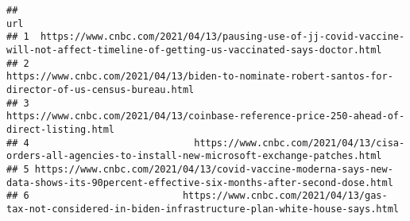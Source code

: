 \documentclass[
]{article}
\begin{document}
\begin{verbatim}
##                                                                                                                                   url
## 1  https://www.cnbc.com/2021/04/13/pausing-use-of-jj-covid-vaccine-will-not-affect-timeline-of-getting-us-vaccinated-says-doctor.html
## 2                               https://www.cnbc.com/2021/04/13/biden-to-nominate-robert-santos-for-director-of-us-census-bureau.html
## 3                                           https://www.cnbc.com/2021/04/13/coinbase-reference-price-250-ahead-of-direct-listing.html
## 4                             https://www.cnbc.com/2021/04/13/cisa-orders-all-agencies-to-install-new-microsoft-exchange-patches.html
## 5 https://www.cnbc.com/2021/04/13/covid-vaccine-moderna-says-new-data-shows-its-90percent-effective-six-months-after-second-dose.html
## 6                           https://www.cnbc.com/2021/04/13/gas-tax-not-considered-in-biden-infrastructure-plan-white-house-says.html

\end{verbatim}
\end{document}
